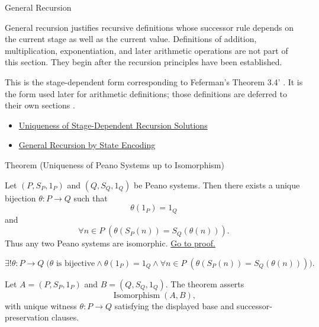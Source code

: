 \begin{topicbox}{General Recursion}
\begin{remark*}[Interpretation]
General recursion justifies recursive definitions whose successor rule depends
on the current stage as well as the current value. Definitions of addition,
multiplication, exponentiation, and later arithmetic operations are not part
of this section. They begin after the recursion principles have been
established.
\end{remark*}

\begin{remark*}
This is the stage-dependent form corresponding to Feferman's Theorem 3.4'
\citep{FefermanNumberSystems1964}. It is the form used later for arithmetic
definitions; those definitions are deferred to their own sections
\citep{FefermanNumberSystems1964,MendelsonNumberSystemsFoundationsAnalysis}.
\end{remark*}

\begin{dependencies}
\begin{itemize}
  \item \hyperref[lem:uniqueness-of-general-recursive-functions]{Uniqueness of Stage-Dependent Recursion Solutions}
  \item \hyperref[thm:general-recursion-by-state-encoding]{General Recursion by State Encoding}
\end{itemize}
\end{dependencies}

\begin{theorembox}{Theorem (Uniqueness of Peano Systems up to Isomorphism)}
\begin{theorem}
\label{thm:uniqueness-of-peano-systems-up-to-isomorphism}
Let $(P,S_P,1_P)$ and $(Q,S_Q,1_Q)$ be Peano systems. Then there exists a
unique bijection $\theta:P\to Q$ such that
\[
\theta(1_P)=1_Q
\]
and
\[
\forall n\in P\;(\theta(S_P(n))=S_Q(\theta(n))).
\]
Thus any two Peano systems are isomorphic.
\hyperref[prf:uniqueness-of-peano-systems-up-to-isomorphism]{Go to proof.}
\end{theorem}
\end{theorembox}

\begin{remark*}
\[
\exists! \theta:P\to Q\;
\bigl(\theta \text{ is bijective}\land \theta(1_P)=1_Q
\land \forall n\in P\;(\theta(S_P(n))=S_Q(\theta(n)))\bigr).
\]
\end{remark*}

\begin{remark*}
Let $A=(P,S_P,1_P)$ and $B=(Q,S_Q,1_Q)$. The theorem asserts
\[
\operatorname{Isomorphism}(A,B),
\]
with unique witness $\theta:P\to Q$ satisfying the displayed base and
successor-preservation clauses.
\end{remark*}


\end{topicbox}
